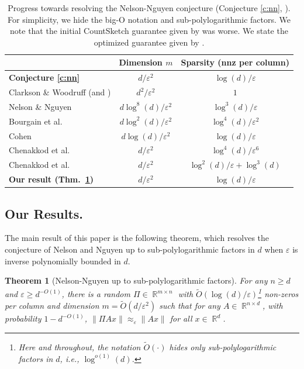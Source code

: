 \documentclass[11pt]{amsart}
\numberwithin{equation}{section}
\numberwithin{equation}{section}
\DeclareMathOperator{\R}{\mathbb{R}}
\newtheorem{theorem}{Theorem}[section]
\begin{document}
\begin{table}\centering
\caption{Progress towards resolving the Nelson-Nguyen conjecture (Conjecture \ref{c:nn}, \cite{nelson2013osnap}). For simplicity, we hide the big-O notation and sub-polylogarithmic factors. We note that the initial CountSketch guarantee given by \cite{clarkson2013low} was worse. We state the optimized guarantee given by \cite{nelson2013osnap,meng2013low}.}\vspace{2mm}
\begin{tabular}{l||c|c}
     & Dimension $m$ & Sparsity (nnz per column) \\
    \hline\hline
    \textbf{Conjecture \ref{c:nn}} \cite{nelson2013osnap} & $d/\varepsilon^2$ & $\log(d)/\varepsilon$
    \\
    \hline
    Clarkson \& Woodruff \cite{clarkson2013low} (and \cite{nelson2013osnap,meng2013low}) &$d^2/\varepsilon^2$ & $1$ \\
Nelson \& Nguyen \cite{nelson2013osnap} & $d\log^8(d)/\varepsilon^2$ & $\log^3(d)/\varepsilon$ \\
Bourgain et al. \cite{bourgain2015toward}&  $d\log^2(d)/\varepsilon^2$ & $\log^4(d)/\varepsilon^2$\\
Cohen \cite{cohen2016nearly}& $d\log(d)/\varepsilon^2$ &
$\log(d)/\varepsilon$\\
Chenakkod et al. \cite{chenakkod2024optimal}& $d/\varepsilon^2$
& $\log^4(d)/\varepsilon^6$
                \\
Chenakkod et al. \cite{chenakkod2025optimal}& $d/\varepsilon^2$ & $\log^2(d)/\varepsilon +\log^3(d)$\\
\hline
\textbf{Our result (Thm.\ \ref{t:main})} & $d/\varepsilon^2$ & $\log(d)/\varepsilon$
\end{tabular}
\label{tab:comparison}
\end{table}

\subsection{Our Results.}

The main result of this paper is the following theorem, which resolves the conjecture of Nelson and Nguyen up to sub-polylogarithmic factors in $d$ when $\varepsilon$ is inverse polynomially bounded in $d$.

\begin{theorem}[Nelson-Nguyen up to sub-polylogarithmic factors]\label{t:main}
    For any $n\geq d$ and $\varepsilon \geq d^{-O(1)}$, there is a random $\Pi\in\R^{m\times n}$ with $\tilde O(\log(d)/\varepsilon)$\footnote{Here and throughout, the notation $\tilde O(\cdot)$ hides only sub-polylogarithmic factors in $d$, i.e., $\log^{o(1)}(d)$.} non-zeros per column and dimension $m=\tilde O(d/\varepsilon^2)$ such that for any $A\in\R^{n\times d}$, with probability $1-d^{-O(1)}$, $\|\Pi Ax\|\approx_\varepsilon\|Ax\|$ for all $x\in\R^d$. 
\end{theorem}
\end{document}
